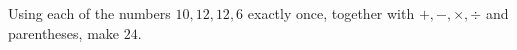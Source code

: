 Using each of the numbers $10,12,12,6$ exactly once, together with $+,-,\times,\div$ and parentheses, make $24$.
